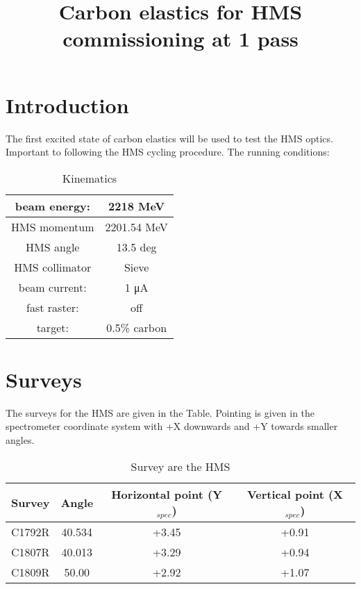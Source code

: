 \documentclass[]{article}
\title{Carbon elastics for HMS commissioning at 1 pass}
\begin{document}
\maketitle


\section{Introduction}

The first excited state of carbon elastics will be used to test the HMS optics.
Important to following the HMS cycling procedure.
The running conditions:
\begin{table}[h]
	\begin{center}
		\begin{tabular}[]{|c|c|} \hline\hline
			beam energy: & 2218 MeV\\ \hline
			HMS momentum & 2201.54 MeV \\ \hline
			HMS angle & 13.5 deg \\ \hline
			HMS collimator & Sieve \\ \hline
			beam current: & 1 μA\\ \hline
			fast raster: & off\\ \hline
			target: & 0.5\% carbon\\ \hline
		\end{tabular}
		\caption{Kinematics}
	\end{center}
\end{table}

\section{Surveys}

The surveys for the HMS are given in the Table.  Pointing is given in the spectrometer 
coordinate system with +X downwards and +Y towards smaller angles.
	\begin{table}[h]
		\begin{center}
			\begin{tabular}[]{|c|c||c|c|} \hline\hline
				Survey & Angle  & Horizontal point (Y$_{spec}$) & Vertical point (X$_{spec}$)\\ \hline
				C1792R & 40.534 & +3.45& +0.91\\ \hline
				C1807R & 40.013 & +3.29 & +0.94 \\ \hline
				C1809R & 50.00  & +2.92 & +1.07 \\ \hline
			\end{tabular}
			\caption{Survey are the HMS}
		\end{center}
	\end{table}
	
\end{document}
